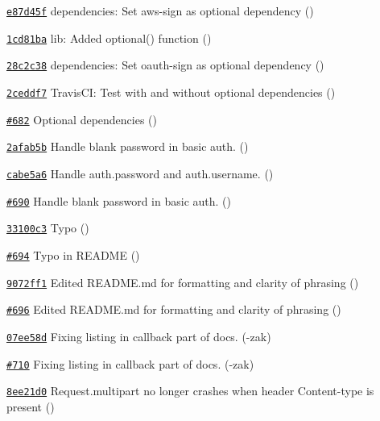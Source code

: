 \begin{DoxyItemize}
\item \href{https://github.com/mikeal/request/commit/e87d45fe89ea220035bf07696a70292763f7135f}{\tt e87d45f} dependencies\+: Set {\ttfamily aws-\/sign} as optional dependency ()
\item \href{https://github.com/mikeal/request/commit/1cd81ba30908b77cff2fa618aeb232fefaa53ada}{\tt 1cd81ba} lib\+: Added optional() function ()
\item \href{https://github.com/mikeal/request/commit/28c2c3820feab0cc719df213a60838db019f3e1a}{\tt 28c2c38} dependencies\+: Set {\ttfamily oauth-\/sign} as optional dependency ()
\item \href{https://github.com/mikeal/request/commit/2ceddf7e793feb99c5b6a76998efe238965b22cd}{\tt 2ceddf7} Travis\+C\+I\+: Test with and without optional dependencies ()
\item \href{https://github.com/mikeal/request/pull/682}{\tt \#682} Optional dependencies ()
\item \href{https://github.com/mikeal/request/commit/2afab5b665a2e03becbc4a42ad481bb737405655}{\tt 2afab5b} Handle blank password in basic auth. ()
\item \href{https://github.com/mikeal/request/commit/cabe5a62dc71282ce8725672184efe9d97ba79a5}{\tt cabe5a6} Handle {\ttfamily auth.\+password} and {\ttfamily auth.\+username}. ()
\item \href{https://github.com/mikeal/request/pull/690}{\tt \#690} Handle blank password in basic auth. ()
\item \href{https://github.com/mikeal/request/commit/33100c3c7fa678f592374f7b2526fe9a0499b6f6}{\tt 33100c3} Typo ()
\item \href{https://github.com/mikeal/request/pull/694}{\tt \#694} Typo in R\+E\+A\+D\+M\+E ()
\item \href{https://github.com/mikeal/request/commit/9072ff1556bcb002772838a94e1541585ef68f02}{\tt 9072ff1} Edited R\+E\+A\+D\+M\+E.\+md for formatting and clarity of phrasing ()
\item \href{https://github.com/mikeal/request/pull/696}{\tt \#696} Edited R\+E\+A\+D\+M\+E.\+md for formatting and clarity of phrasing ()
\item \href{https://github.com/mikeal/request/commit/07ee58d3a8145740ba34cc724f123518e4b3d1c3}{\tt 07ee58d} Fixing listing in callback part of docs. (-\/zak)
\item \href{https://github.com/mikeal/request/pull/710}{\tt \#710} Fixing listing in callback part of docs. (-\/zak)
\item \href{https://github.com/mikeal/request/commit/8ee21d0dcc637090f98251eba22b9f4fd1602f0e}{\tt 8ee21d0} Request.\+multipart no longer crashes when header \textquotesingle{}Content-\/type\textquotesingle{} is present ()

\end{DoxyItemize}
